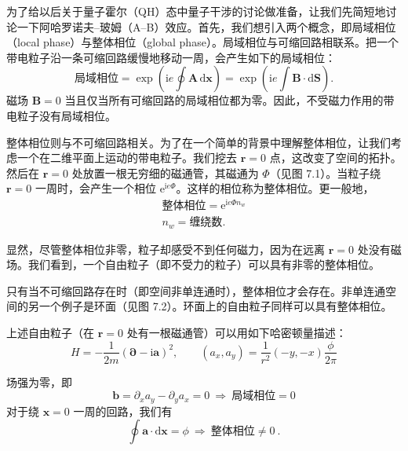 
为了给以后关于量子霍尔（QH）态中量子干涉的讨论做准备，让我们先简短地讨论一下阿哈罗诺夫--玻姆（A--B）效应。首先，我们想引入两个概念，即局域相位（local phase）与整体相位（global phase）。局域相位与可缩回路相联系。把一个带电粒子沿一条可缩回路缓慢地移动一周，会产生如下的局域相位：
\begin{equation*}
\text{局域相位} = \exp\left(\mathrm{i}e\oint\pmb{A}\,\mathrm{d}\pmb{x}\right) = \exp\left(\mathrm{i}e\int\pmb{B}\cdot\mathrm{d}\pmb{S}\right).
\end{equation*}
磁场 $\pmb{B}=0$ 当且仅当所有可缩回路的局域相位都为零。因此，不受磁力作用的带电粒子没有局域相位。

整体相位则与不可缩回路相关。为了在一个简单的背景中理解整体相位，让我们考虑一个在二维平面上运动的带电粒子。我们挖去 $\pmb{r}=0$ 点，这改变了空间的拓扑。然后在 $\pmb{r}=0$ 处放置一根无穷细的磁通管，其磁通为 $\Phi$（见图 7.1）。当粒子绕 $\pmb{r}=0$ 一周时，会产生一个相位 $\mathrm{e}^{\mathrm{i}e\Phi}$。这样的相位称为整体相位。更一般地，
\begin{gather*}
\text{整体相位} = \mathrm{e}^{\mathrm{i}e\Phi n_w}\\
n_w = \text{缠绕数}.
\end{gather*}

显然，尽管整体相位非零，粒子却感受不到任何磁力，因为在远离 $\pmb{r}=0$ 处没有磁场。我们看到，一个自由粒子（即不受力的粒子）可以具有非零的整体相位。

只有当不可缩回路存在时（即空间非单连通时），整体相位才会存在。非单连通空间的另一个例子是环面（见图 7.2）。环面上的自由粒子同样可以具有整体相位。

上述自由粒子（在 $\pmb{r}=0$ 处有一根磁通管）可以用如下哈密顿量描述：
\begin{equation*}
H = -\frac{1}{2m}\left(\pmb{\partial}-\mathrm{i}\pmb{a}\right)^2, \qquad (a_x, a_y) = \frac{1}{r^2}(-y, -x)\frac{\phi}{2\pi}
\end{equation*}



场强为零，即
\begin{equation*}
\pmb{b} = \partial_x a_y - \partial_y a_x = 0 \ \Longrightarrow\ \text{局域相位} = 0
\end{equation*}
对于绕 $\pmb{x}=0$ 一周的回路，我们有
\begin{equation*}
\oint\pmb{a}\cdot\mathrm{d}\pmb{x} = \phi \ \Longrightarrow\ \text{整体相位} \neq 0\ .
\end{equation*}

